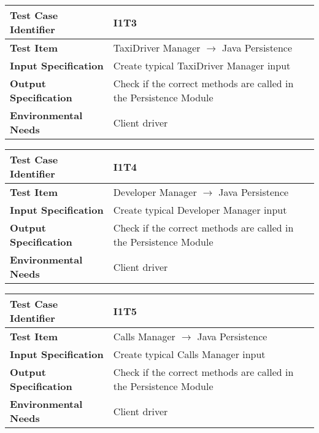 \begin{table}[!htbp]
\begin{center}
\begin{tabular}[t]{p{}p{}}

\hline
\textbf{Test Case Identifier} & I1T3 \\
\hline
\textbf{Test Item} & TaxiDriver Manager $\rightarrow$ Java Persistence \\
\hline
\textbf{Input Specification} & Create typical TaxiDriver Manager input \\
\hline
\textbf{Output Specification} & Check if the correct methods are called in the Persistence Module \\
\hline
\textbf{Environmental Needs} & Client driver \\
\hline

\end{tabular}
\end{center}
\end{table}

\begin{table}[!htbp]
\begin{center}
\begin{tabular}[t]{p{}p{}}

\hline
\textbf{Test Case Identifier} & I1T4 \\
\hline
\textbf{Test Item} & Developer Manager $\rightarrow$ Java Persistence \\
\hline
\textbf{Input Specification} & Create typical Developer Manager input \\
\hline
\textbf{Output Specification} & Check if the correct methods are called in the Persistence Module \\
\hline
\textbf{Environmental Needs} & Client driver \\
\hline

\end{tabular}
\end{center}
\end{table}

\begin{table}[!htbp]
\begin{center}
\begin{tabular}[t]{p{}p{}}

\hline
\textbf{Test Case Identifier} & I1T5 \\
\hline
\textbf{Test Item} & Calls Manager $\rightarrow$ Java Persistence \\
\hline
\textbf{Input Specification} & Create typical Calls Manager input \\
\hline
\textbf{Output Specification} & Check if the correct methods are called in the Persistence Module \\
\hline
\textbf{Environmental Needs} & Client driver \\
\hline

\end{tabular}
\end{center}
\end{table}
\clearpage

